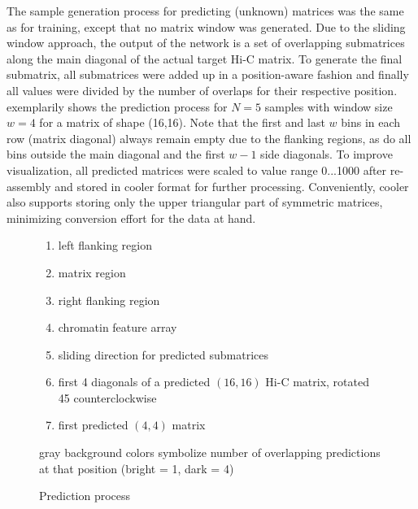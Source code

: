 The sample generation process for predicting (unknown) matrices was the same as for training,
except that no matrix window was generated.
Due to the sliding window approach, the output of the network is a set of overlapping submatrices along the main diagonal of the actual target Hi-C matrix.
To generate the final submatrix, all submatrices were added up in a position-aware fashion 
and finally all values were divided by the number of overlaps for their respective position.
 exemplarily shows the prediction process for $N=5$ samples with window size $w=4$ for a matrix of shape (16,16).
Note that the first and last $w$ bins in each row (matrix diagonal) always remain empty due to the flanking regions,
as do all bins outside the main diagonal and the first $w-1$ side diagonals.
To improve visualization, all predicted matrices were scaled to value range 0...1000 after re-assembly and stored in cooler format for further processing.
Conveniently, cooler also supports storing only the upper triangular part of symmetric matrices, minimizing conversion effort for the data at hand.

\begin{figure}
 \begin{minipage}{0.65\textwidth}
    \caption{Prediction process}
    \label{fig:methods:prediction}
 \end{minipage}\hfill
 \begin{minipage}{0.3\textwidth}
 \scriptsize
  \begin{enumerate}[label=\Alph*:,leftmargin=*]
   \raggedright
    \item left flanking region
    \item matrix region
    \item right flanking region
    \item chromatin feature array
    \item sliding direction for predicted submatrices
    \item first 4 diagonals of a predicted $(16, 16)$ Hi-C matrix, rotated \SI{45}{\deg} counterclockwise
    \item first predicted $(4, 4)$ matrix
\end{enumerate}
\raggedright{gray background colors symbolize number of overlapping predictions at that position (bright = 1, dark = 4)}
 \end{minipage}
\end{figure}

